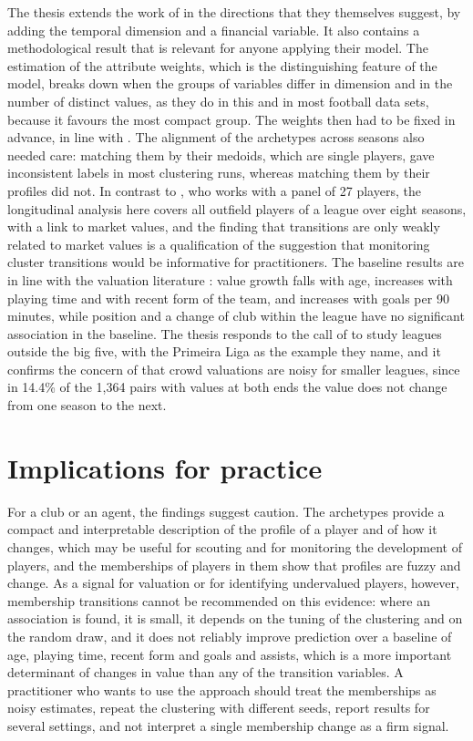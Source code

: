 The thesis extends the work of  in the directions that they themselves suggest, by adding the temporal dimension and a financial variable. It also contains a methodological result that is relevant for anyone applying their model. The estimation of the attribute weights, which is the distinguishing feature of the model, breaks down when the groups of variables differ in dimension and in the number of distinct values, as they do in this and in most football data sets, because it favours the most compact group. The weights then had to be fixed in advance, in line with . The alignment of the archetypes across seasons also needed care: matching them by their medoids, which are single players, gave inconsistent labels in most clustering runs, whereas matching them by their profiles did not. In contrast to , who works with a panel of 27 players, the longitudinal analysis here covers all outfield players of a league over eight seasons, with a link to market values, and the finding that transitions are only weakly related to market values is a qualification of the suggestion that monitoring cluster transitions would be informative for practitioners. The baseline results are in line with the valuation literature \cite{franceschi2024determinants}: value growth falls with age, increases with playing time and with recent form of the team, and increases with goals per 90 minutes, while position and a change of club within the league have no significant association in the baseline. The thesis responds to the call of  to study leagues outside the big five, with the Primeira Liga as the example they name, and it confirms the concern of  that crowd valuations are noisy for smaller leagues, since in 14.4\% of the 1,364 pairs with values at both ends the value does not change from one season to the next.

\section{Implications for practice}
\label{sec:disc-practice}

For a club or an agent, the findings suggest caution. The archetypes provide a compact and interpretable description of the profile of a player and of how it changes, which may be useful for scouting and for monitoring the development of players, and the memberships of players in them show that profiles are fuzzy and change. As a signal for valuation or for identifying undervalued players, however, membership transitions cannot be recommended on this evidence: where an association is found, it is small, it depends on the tuning of the clustering and on the random draw, and it does not reliably improve prediction over a baseline of age, playing time, recent form and goals and assists, which is a more important determinant of changes in value than any of the transition variables. A practitioner who wants to use the approach should treat the memberships as noisy estimates, repeat the clustering with different seeds, report results for several settings, and not interpret a single membership change as a firm signal.

